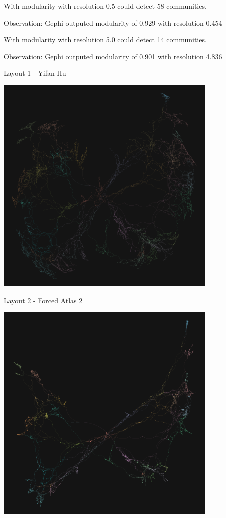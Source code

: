 \documentclass{amsart}
\theoremstyle{definition}
\theoremstyle{remark}
\numberwithin{equation}{section}
\begin{document}
With modularity with resolution 0.5 could detect 58 communities. \vspace{0.2cm}

Observation: Gephi outputed modularity of 0.929 with resolution 0.454 \vspace{0.2cm}

With modularity with resolution 5.0 could detect 14 communities. \vspace{0.2cm}
 
Observation: Gephi outputed modularity of 0.901 with resolution 4.836 \vspace{0.2cm}


Layout 1 - Yifan Hu \vspace{0.5cm}

\centering
\begin{minipage}{1\textwidth}
\centering
\includegraphics[width=0.8\textwidth]{images/power_layout01_v0.png} %
\end{minipage}

\vspace{0.5cm}

Layout 2 - Forced Atlas 2 \vspace{0.5cm}

\centering
\begin{minipage}{1\textwidth}
\centering
\includegraphics[width=0.8\textwidth]{images/power_layout02_v0.png} %
\end{minipage}
\end{document}
